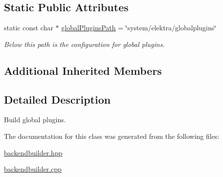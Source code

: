 \subsection*{Static Public Attributes}
\begin{DoxyCompactItemize}
\item 
\mbox{\label{classkdb_1_1tools_1_1GlobalPluginsBuilder_ac4300427e2f9e072378f350c0e112156}} 
static const char $\ast$ \mbox{\hyperlink{classkdb_1_1tools_1_1GlobalPluginsBuilder_ac4300427e2f9e072378f350c0e112156}{global\+Plugins\+Path}} = \char`\"{}system/elektra/globalplugins\char`\"{}
\begin{DoxyCompactList}\small\item\em Below this path is the configuration for global plugins. \end{DoxyCompactList}\end{DoxyCompactItemize}
\subsection*{Additional Inherited Members}


\subsection{Detailed Description}
Build global plugins. 

The documentation for this class was generated from the following files\+:\begin{DoxyCompactItemize}
\item 
\mbox{\hyperlink{backendbuilder_8hpp}{backendbuilder.\+hpp}}\item 
\mbox{\hyperlink{backendbuilder_8cpp}{backendbuilder.\+cpp}}\end{DoxyCompactItemize}

